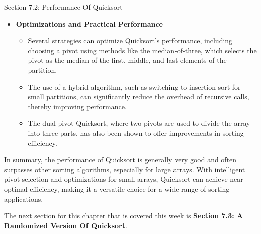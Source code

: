 \begin{notes}{Section 7.2: Performance Of Quicksort}
\begin{itemize}
        \item \textbf{Optimizations and Practical Performance}
        \begin{itemize}
            \item Several strategies can optimize Quicksort's performance, including choosing a pivot using methods like the median-of-three, which selects the pivot as the median of the first, middle, 
            and last elements of the partition.
            \item The use of a hybrid algorithm, such as switching to insertion sort for small partitions, can significantly reduce the overhead of recursive calls, thereby improving performance.
            \item The dual-pivot Quicksort, where two pivots are used to divide the array into three parts, has also been shown to offer improvements in sorting efficiency.
        \end{itemize}
    \end{itemize}
    
    In summary, the performance of Quicksort is generally very good and often surpasses other sorting algorithms, especially for large arrays. With intelligent pivot selection and optimizations for 
    small arrays, Quicksort can achieve near-optimal efficiency, making it a versatile choice for a wide range of sorting applications.    
\end{notes}

The next section for this chapter that is covered this week is \textbf{Section 7.3: A Randomized Version Of Quicksort}.


